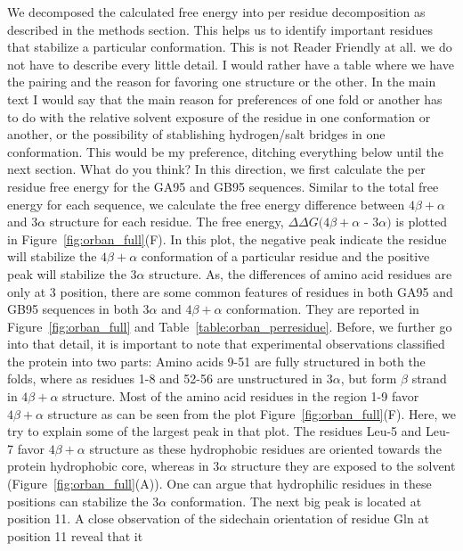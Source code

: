 \documentclass[12pt]{article}
\newcommand{\Alberto}[1]{\color{ForestGreen}#1\normalcolor }
\begin{document}
We decomposed the calculated free energy into per residue decomposition as described in the methods
section. This helps us to
identify important residues that stabilize a particular conformation. 
\Alberto{This is not Reader Friendly at all. we do not have to describe every little detail. I would
    rather have a table where we have the pairing and the reason for favoring one structure or the
    other. In the main text I would say that the main reason for preferences of one fold or another
    has to do with the relative solvent exposure of the residue in one conformation or another, or
    the possibility of stablishing hydrogen/salt bridges in one conformation. This would be my
preference, ditching everything below until the next section. What do you think?}
In this direction, we first calculate the per residue free energy for the GA95 and GB95 sequences. Similar to the total 
free energy for each sequence, we calculate the free energy difference between $4 \beta + \alpha$ and $3 \alpha$ structure for each 
residue. The free energy, $\Delta \Delta G (4 \beta + \alpha$ - $3 \alpha)$ is plotted in Figure~\ref{fig:orban_full}(F). 
In this plot, the negative peak indicate the residue will stabilize the $4 \beta + \alpha$ conformation of a particular
residue and the positive peak will stabilize the $3 \alpha$ structure. As, the differences of amino acid 
residues are only at 3 position, there are some common features of residues in both GA95 and GB95 sequences in both 
$3 \alpha$ and $4 \beta + \alpha$ conformation. They are reported in Figure~\ref{fig:orban_full} 
and Table~\ref{table:orban_perresidue}. Before, we further go into that detail, it is important to note that 
experimental observations classified the protein into two parts: Amino acids 9-51 are fully structured in both
the folds, where as residues 1-8 and 52-56 are unstructured in $3 \alpha$, but form $\beta$ strand in $4 \beta + \alpha$ structure.
Most of the amino acid residues in the region 1-9 favor $4 \beta + \alpha$ structure as can be seen from the plot 
Figure~\ref{fig:orban_full}(F). Here, we try to explain some of the largest peak in that plot. The residues Leu-5 and 
Leu-7 favor $4 \beta + \alpha$ structure as these hydrophobic residues are oriented towards the protein hydrophobic 
core, whereas in $3 \alpha$ structure they are exposed to the solvent (Figure~\ref{fig:orban_full}(A)). One can argue that 
hydrophilic residues in these positions can stabilize the $3 \alpha$ conformation.
The next big peak is located at position 11. A close observation of the sidechain orientation of residue Gln at position 11 reveal that it
\end{document}

